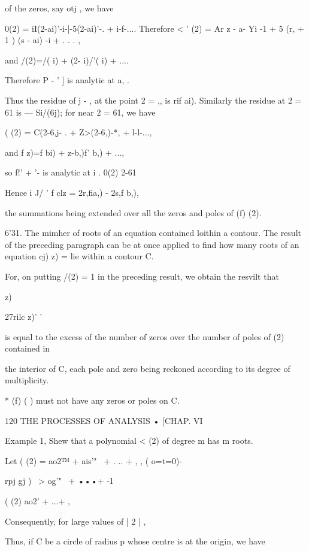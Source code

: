 of the zeros, say otj , we have 

0(2) = iI(2-ai)'-i-|-5(2-ai)'-. + i-f-.... 
Therefore < ' (2) = Ar   z - a- Yi -1 + 5 (r, + 1 ) (s - ai) -i + . . . , 

and /(2)=/( i) + (2- i)/'( i) + .... 

Therefore P  - '  ] is analytic at a, . 

Thus the residue of j   - , at the point 2 =  ,, is rif ai). 
Similarly the residue at 2 = 61 is — Si/(6j); for near 2 = 61, we have 

( (2) = C(2-6,j- . + Z>(2-6,)-*, + l-l-..., 

and f z)=f bi) +  z-b,)f' b,) + ..., 

so f!'  + '-  is analytic at i . 
0(2) 2-61 

Hence i J/ '  f  clz = 2r,fia,) - 2s,f b,), 

the summations being extended over all the zeros and poles of (f) (2). 

6'31. The mimher of roots of an equation contained loithin a contour. 
The result of the preceding paragraph can be at once applied to find how many roots of 
an equation cj)  z) = lie within a contour C. 

For, on putting /(2) = 1 in the preceding result, we obtain the resvilt that 



z) 



27rilc  z)' ' 

is equal to the excess of the number of zeros over the number of poles of (2) contained in 

the interior of C, each pole and zero being reckoned according to its degree of multiplicity. 

* (f) ( ) must not have any zeros or poles on C. 



120 THE PROCESSES OF ANALYSIS • [CHAP. VI 

Example 1, Shew that a polynomial <  (2) of degree m has m roots. 

Let (  (2) = ao2™ + ais'"~  + . .. +  , , ( o=t=0)- 

rpj gj ) \  >  og'"~  + •••+    -1 

( (2) ao2'  + ...+ ,  

Consequently, for large values of | 2 | , 

Thus, if C be a circle of radius p whose centre is at the origin, we have 

